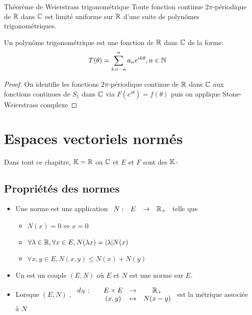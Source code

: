 \documentclass[]{report}
\begin{document}
    \begin{cor}{Théorème de Weierstrass trigonométrique}{}
        Toute fonction continue $2\pi$-périodique de $\mathbb{R}$ dans $\mathbb{C}$ est limité uniforme sur $\mathbb{R}$ d'une suite de polynômes trigonométriques.
    \end{cor}

    \begin{re}{}{}
        Un polynôme trigonométrique est une fonction de $\mathbb{R}$ dans $\mathbb{C}$ de la forme:
        \[T(\theta)=\sum_{k=-n}^{n}a_n e^{ik\theta},n\in \mathbb{N}\]
    \end{re}

    \begin{proof}
        On identifie les fonctions $2\pi$-périodique continue de $\mathbb{R}$ dans $\mathbb{C}$ aux fonctions continues de $S_1$ dans $\mathbb{C}$ via $F(e^{i\theta})=f(\theta)$ puis on applique Stone-Weierstrass complexe
    \end{proof}

    \chapter{Espaces vectoriels normés}

    Dans tout ce chapitre, $\mathbb{K}=\mathbb{R}$ ou $\mathbb{C}$ et $E$ et $F$ sont des $\mathbb{K}$-\evs

    \section{Propriétés des normes}

    \begin{ra}{}{}
        \begin{itemize}
            \item Une norme est une application $\begin{array}{ccccc} N : & E & \to & \mathbb{R}_+ \end{array}$ telle que
            \begin{itemize}
                \item $N(x)=0\iff x=0$
                \item $\forall \lambda\in \mathbb{R},\forall x\in E, N(\lambda x)=|\lambda| N(x)$
                \item $\forall x,y\in E, N(x,y)\le N(x)+N(y)$
            \end{itemize}
            \item Un \evn est un couple $(E,N)$ où $E$ \ev et $N$ est une norme sur $E$.
            \item Lorsque $(E,N)$ \evn, $\begin{array}{ccccc} d_N : & & E\times E & \to & \mathbb{R}_+ \\ & & (x,y) & \mapsto & N(x-y) \end{array}$ est la métrique associée à $N$
        \end{itemize}
    \end{ra}
\end{document}
